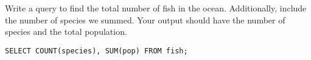 \begin{blocksection}
\question Write a query to find the total number of fish in the ocean. Additionally, include the number of species we summed. Your output should have the number of species and the total population.

\begin{solution}[0.7in]
\begin{lstlisting}
SELECT COUNT(species), SUM(pop) FROM fish;
\end{lstlisting}
\end{solution}
\end{blocksection}
